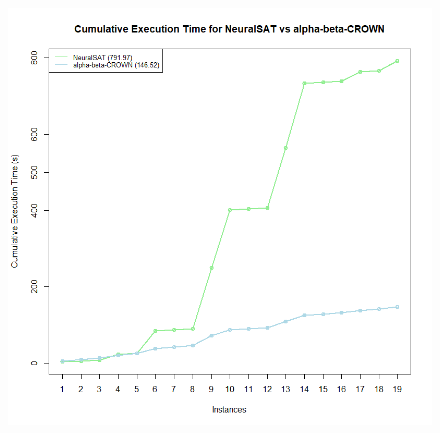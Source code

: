 \begin{figure}[h]
\centering 
\includegraphics[width=0.8\linewidth]{imagini/interpretare rezultate/cumulative_NeuralSAT_vs_abC.png}
\caption{}
\label{fig:image2} 
\end{figure}
\



